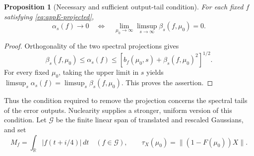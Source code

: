 \documentclass[a4paper,11pt]{article}
\newtheorem{proposition}[theorem]{Proposition}
\theoremstyle{definition}
\begin{document}
\begin{proposition}[Necessary and sufficient output-tail condition]
\label{prop:appE-tail-criterion}
For each fixed $f$ satisfying \eqref{eq:appE-projected},
\begin{equation}
 \alpha_s(f)\longrightarrow0
 \quad\Longleftrightarrow\quad
 \lim_{\mu_0\to\infty}\limsup_{s\to\infty}
 \beta_s(f,\mu_0)=0.
 \label{eq:appE-tail-criterion}
\end{equation}
\end{proposition}
\begin{proof}
Orthogonality of the two spectral projections gives
\[
 \beta_s(f,\mu_0)\le\alpha_s(f)
 \le[b_f(\mu_0,s)+\beta_s(f,\mu_0)^2]^{1/2}.
\]
For every fixed $\mu_0$, taking the upper limit in $s$ yields
$\limsup_s\alpha_s(f)=\limsup_s\beta_s(f,\mu_0)$.
This proves the assertion.
\end{proof}

Thus the condition required to remove the projection concerns the spectral tails of the error outputs. Nuclearity supplies a stronger, uniform version of this condition. Let $\mathcal G$ be the finite linear span of translated and rescaled Gaussians, and set
\begin{equation}
 M_f=\int_{\mathbb R}|f(t+i/4)|\,dt\quad(f\in\mathcal G),
 \qquad
 \tau_X(\mu_0)=\|(1-F(\mu_0))X\|.
 \label{eq:appE-kernel-and-tail}
\end{equation}
\end{document}
